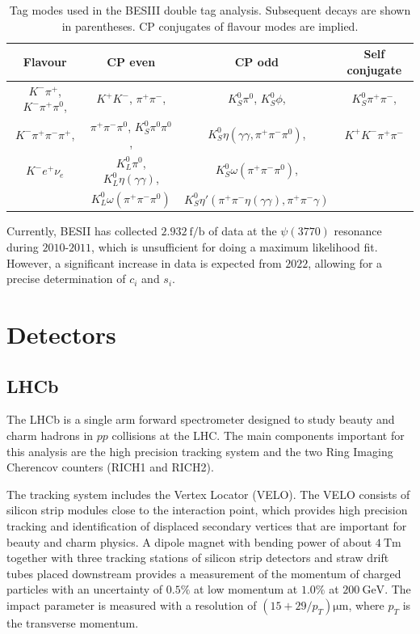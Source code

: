 \documentclass[12pt, a4paper, notitlepage, onecolumn]{article}
\numberwithin{equation}{section}
\begin{document}
\begin{table}[H]
  \centering
  \caption{Tag modes used in the BESIII double tag analysis. Subsequent decays are shown in parentheses. CP conjugates of flavour modes are implied.}
  \label{table_tag_modes}
  \begin{tabular}{cccc} 
    \toprule
    Flavour & CP even & CP odd & Self conjugate \\
    \midrule
    $K^-\pi^+$, $K^-\pi^+\pi^0$, & $K^+K^-$, $\pi^+\pi^-$,                  & $K_S^0\pi^0$, $K_S^0\phi$,                  & $K_S^0\pi^+\pi^-$, \\
    $K^-\pi^+\pi^-\pi^+$,        & $\pi^+\pi^-\pi^0$, $K_S^0\pi^0\pi^0$,    & $K_S^0\eta(\gamma\gamma, \pi^+\pi^-\pi^0)$, & $K^+K^-\pi^+\pi^-$ \\
    $K^- e^+\nu_e$               & $K_L^0\pi^0$, $K_L^0\eta(\gamma\gamma)$, & $K_S^0\omega(\pi^+\pi^-\pi^0)$,             & \\
                                 & $K_L^0\omega(\pi^+\pi^-\pi^0)$           & $K_S^0\eta'(\pi^+\pi^-\eta(\gamma\gamma), \pi^+\pi^-\gamma)$  & \\
    \bottomrule
  \end{tabular}
\end{table}

Currently, BESII has collected $\SI{2.932}{\femto\per\barn}$ of data at the $\psi(3770)$ resonance during $2010$-$2011$, which is unsufficient for doing a maximum likelihood fit. However, a significant increase in data is expected from $2022$, allowing for a precise determination of $c_i$ and $s_i$.
\section{Detectors}
\subsection{LHCb}
\noindent The LHCb\cite{cite_LHCb} is a single arm forward spectrometer designed to study beauty and charm hadrons in $pp$ collisions at the LHC. The main components important for this analysis are the high precision tracking system and the two Ring Imaging Cherencov counters (RICH1 and RICH2).

The tracking system includes the Vertex Locator (VELO). The VELO consists of silicon strip modules close to the interaction point, which provides high precision tracking and identification of displaced secondary vertices that are important for beauty and charm physics. A dipole magnet with bending power of about $\SI{4}{\tesla\meter}$ together with three tracking stations of silicon strip detectors and straw drift tubes placed downstream provides a measurement of the momentum of charged particles with an uncertainty of $0.5\%$ at low momentum at $1.0\%$ at $\SI{200}{\giga\eV}$. The impact parameter is measured with a resolution of $(15 + 29/p_T)\si{\micro\meter}$, where $p_T$ is the transverse momentum.
\end{document}
